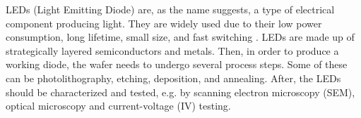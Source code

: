 
LEDs (Light Emitting Diode) are, as the name suggests, a type of electrical component producing light. 
They are widely used due to their low power consumption, long lifetime, small size, and fast switching \cite{unknown}.
LEDs are made up of strategically layered semiconductors and metals.
Then, in order to produce a working diode, the wafer needs to undergo several process steps.
Some of these can be photolithography, etching, deposition, and annealing.
After, the LEDs should be characterized and tested, e.g. by scanning electron microscopy (SEM), optical microscopy and current-voltage (IV) testing.



